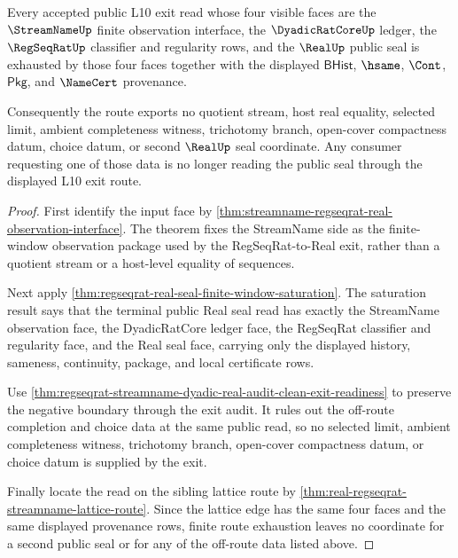 \begin{theorem}
\label{thm:regseqrat-dyadic-streamname-real-public-seal-nonescape}
Every accepted public L10 exit read whose four visible faces are the
$\StreamNameUp$ finite observation interface, the $\DyadicRatCoreUp$ ledger,
the $\RegSeqRatUp$ classifier and regularity rows, and the $\RealUp$ public
seal is exhausted by those four faces together with the displayed
$\mathsf{BHist}$, $\hsame$, $\Cont$, $\mathsf{Pkg}$, and $\NameCert$
provenance.

Consequently the route exports no quotient stream, host real equality,
selected limit, ambient completeness witness, trichotomy branch, open-cover
compactness datum, choice datum, or second $\RealUp$ seal coordinate. Any
consumer requesting one of those data is no longer reading the public seal
through the displayed L10 exit route.
\end{theorem}
\begin{proof}
First identify the input face by
\autoref{thm:streamname-regseqrat-real-observation-interface}. The theorem
fixes the StreamName side as the finite-window observation package used by the
RegSeqRat-to-Real exit, rather than a quotient stream or a host-level equality
of sequences.

Next apply \autoref{thm:regseqrat-real-seal-finite-window-saturation}. The
saturation result says that the terminal public Real seal read has exactly the
StreamName observation face, the DyadicRatCore ledger face, the RegSeqRat
classifier and regularity face, and the Real seal face, carrying only the
displayed history, sameness, continuity, package, and local certificate rows.

Use \autoref{thm:regseqrat-streamname-dyadic-real-audit-clean-exit-readiness}
to preserve the negative boundary through the exit audit. It rules out the
off-route completion and choice data at the same public read, so no selected
limit, ambient completeness witness, trichotomy branch, open-cover compactness
datum, or choice datum is supplied by the exit.

Finally locate the read on the sibling lattice route by
\autoref{thm:real-regseqrat-streamname-lattice-route}. Since the lattice edge
has the same four faces and the same displayed provenance rows, finite route
exhaustion leaves no coordinate for a second public seal or for any of the
off-route data listed above.
\end{proof}

